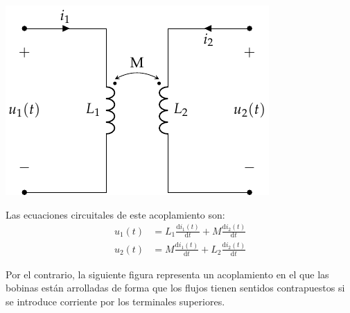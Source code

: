 \begin{center}
  \includegraphics[height=0.2\textheight]{../figs/acoplamiento_circuito.pdf}
\end{center}

Las ecuaciones circuitales de este acoplamiento son:
\begin{align*}
  u_1(t) &= L_1 \frac{\mathrm{d}i_1(t)}{\mathrm{d}t} + M \frac{\mathrm{d}i_2(t)}{\mathrm{d}t}\\
  u_2(t) &= M \frac{\mathrm{d}i_1(t)}{\mathrm{d}t} + L_2 \frac{\mathrm{d}i_2(t)}{\mathrm{d}t}
\end{align*}

Por el contrario, la siguiente figura representa un acoplamiento en el
que las bobinas están arrolladas de forma que los flujos tienen
sentidos contrapuestos si se introduce corriente por los terminales
superiores.

